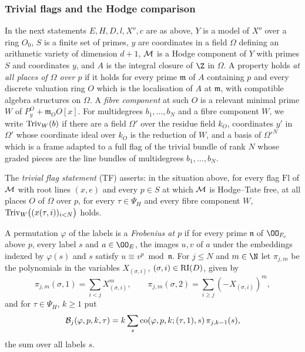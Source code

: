 \subsubsection*{Trivial flags and the Hodge comparison}
In the next statements $E,H,D,l,X^o,c$ are as above, $Y$ is a model of $X^o$ over a ring $O_0$, $S$ is
a finite set of primes, $y$ are coordinates in a field $\Omega$ defining an arithmetic variety of dimension
$d+1$, $\mathcal M$ is a Hodge component of $Y$ with primes $S$ and coordinates $y$, and $A$ is the integral
closure of $\Z$ in $\Omega$. A property holds \emph{at all places of $\Omega$ over $p$} if it holds for
every prime $\mathfrak m$ of $A$ containing $p$ and every discrete valuation ring $O$ which is the
localisation of $A$ at $\mathfrak m$, with compatible algebra structures on $\Omega$. A \emph{fibre
component} at such $O$ is a relevant minimal prime $W$ of $P^O_y+\mathfrak m_OO[x]$. For multidegrees
$b_1,\dots,b_N$ and a fibre component $W$, we write $\mathrm{Triv}_W(b)$ if there are a field $\Omega'$
over the residue field $k_O$, coordinates $y'$ in $\Omega'$ whose coordinate ideal over $k_O$ is the
reduction of $W$, and a basis of $\Omega'^N$ which is a frame adapted to a full flag of the trivial bundle
of rank $N$ whose graded pieces are the line bundles of multidegrees $b_1,\dots,b_N$.

\begin{definition}\label{pf:towergeo:def-triv}
The \emph{trivial flag statement} \textup{(TF)} asserts: in the situation above, for every flag
$\mathrm{Fl}$ of $\mathcal M$ with root lines $(x,e)$ and every $p\in S$ at which $\mathcal M$ is
Hodge--Tate free, at all places $O$ of $\Omega$ over $p$, for every $\tau\in\Psi_H$ and every fibre
component $W$, $\mathrm{Triv}_W\bigl((x(\tau,i))_{i<N}\bigr)$ holds.
\end{definition}

A permutation $\varphi$ of the labels is a \emph{Frobenius at $p$} if for every prime $\mathfrak n$ of
$\OO_{F_c}$ above $p$, every label $s$ and $a\in\OO_E$, the images $u,v$ of $a$ under the embeddings
indexed by $\varphi(s)$ and $s$ satisfy $u\equiv v^p\bmod\mathfrak n$. For $j\le N$ and $m\in\N$ let
$\pi_{j,m}$ be the polynomials in the variables $X_{(\sigma,i)}$, $(\sigma,i)\in\mathrm{RI}(D)$, given by
\[
\pi_{j,m}(\sigma,1)=\sum_{i<j}X_{(\sigma,i)}^m,\qquad\pi_{j,m}(\sigma,2)=\sum_{i\ge j}(-X_{(\sigma,i)})^m,
\]
and for $\tau\in\Psi_H$, $k\ge1$ put
\begin{equation}\label{pf:towergeo:eq-bracket}
\mathcal B_j(\varphi,p,k,\tau)=k\sum_{s}\operatorname{co}(\varphi,p,k;(\tau,1),s)\,\pi_{j,k-1}(s),
\end{equation}
the sum over all labels $s$.


